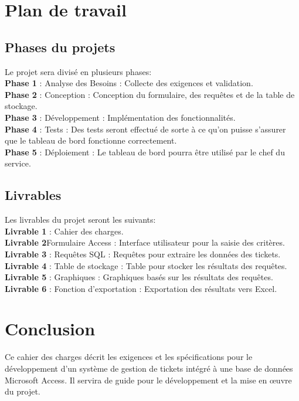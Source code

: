 \documentclass[a4paper,12pt]{article}
\begin{document}
\newpage
\section{Plan de travail}

\subsection{Phases du projets}
Le projet sera divisé en plusieurs phases: \\
\noindent \textbf{Phase 1} : Analyse des Besoins : Collecte des exigences et validation. \\
\noindent \textbf{Phase 2} : Conception : Conception du formulaire, des requêtes et de la table de stockage. \\
\noindent \textbf{Phase 3} : Développement : Implémentation des fonctionnalités. \\
\noindent \textbf{Phase 4} : Tests : Des tests seront effectué de sorte à ce qu'on puisse s'assurer que le tableau de bord fonctionne correctement. \\
\noindent \textbf{Phase 5} : Déploiement : Le tableau de bord pourra être utilisé par le chef du service. \\


\subsection{Livrables}
Les livrables du projet seront les suivants: \\
\noindent \textbf{Livrable 1} : Cahier des charges. \\
\noindent \textbf{Livrable 2}Formulaire Access : Interface utilisateur pour la saisie des critères. \\
\noindent \textbf{Livrable 3} : Requêtes SQL : Requêtes pour extraire les données des tickets. \\
\noindent \textbf{Livrable 4} : Table de stockage : Table pour stocker les résultats des requêtes. \\
\noindent \textbf{Livrable 5} : Graphiques : Graphiques basés sur les résultats des requêtes. \\
\noindent \textbf{Livrable 6} : Fonction d'exportation : Exportation des résultats vers Excel. \\


\newpage
\section{Conclusion}

Ce cahier des charges décrit les exigences et les spécifications pour le développement d'un système de gestion de tickets intégré à une base de données Microsoft Access. Il servira de guide pour le développement et la mise en œuvre du projet.
\end{document}
